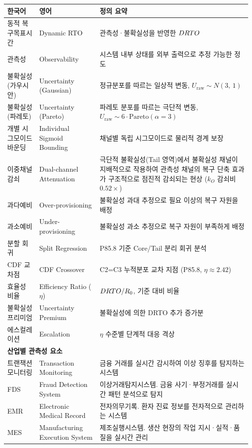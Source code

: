 \begin{longtable}{p{3.5cm} p{4cm} p{7cm}}
\toprule
\textbf{한국어} & \textbf{영어} & \textbf{정의 요약} \\
\midrule
\endhead
동적 복구목표시간 & Dynamic RTO & 관측성·불확실성을 반영한 $DRTO$ \\
관측성 & Observability & 시스템 내부 상태를 외부 출력으로 추정 가능한 정도 \\
불확실성 (가우시안) & Uncertainty (Gaussian) & 정규분포를 따르는 일상적 변동, $U_{\mathrm{raw}} \sim N(3,\,1)$ \\
불확실성 (파레토) & Uncertainty (Pareto) & 파레토 분포를 따르는 극단적 변동, $U_{\mathrm{raw}} \sim 6 \cdot \mathrm{Pareto}(\alpha=3)$ \\
개별 시그모이드 바운딩 & Individual Sigmoid Bounding & 채널별 독립 시그모이드로 물리적 경계 보장 \\
이중채널 감쇠 & Dual-channel Attenuation & 극단적 불확실성(Tail 영역)에서 불확실성 채널이 지배적으로 작용하여 관측성 채널의 복구 단축 효과가 구조적으로 점진적 감쇠되는 현상 ($k_O$ 감쇠비 $0.52\times$) \\
과다예비 & Over-provisioning & 불확실성 과대 추정으로 필요 이상의 복구 자원을 배정 \\
과소예비 & Under-provisioning & 불확실성 과소 추정으로 복구 자원이 부족하게 배정 \\
분할 회귀 & Split Regression & P85.8 기준 Core/Tail 분리 회귀 분석 \\
CDF 교차점 & CDF Crossover & C2=C3 누적분포 교차 지점 (P85.8, $\eta \approx 2.42$) \\
효율성 비율 & Efficiency Ratio ($\eta$) & $DRTO / R_0$, 기준 대비 비율 \\
불확실성 프리미엄 & Uncertainty Premium & 불확실성에 의한 DRTO 추가 증가분 \\
에스컬레이션 & Escalation & $\eta$ 수준별 단계적 대응 격상 \\
\midrule
\multicolumn{3}{l}{\textbf{산업별 관측성 요소}} \\
\midrule
트랜잭션 모니터링 & Transaction Monitoring & 금융 거래를 실시간 감시하여 이상 징후를 탐지하는 시스템 \\
FDS & Fraud Detection System & 이상거래탐지시스템. 금융 사기·부정거래를 실시간 패턴 분석으로 탐지 \\
EMR & Electronic Medical Record & 전자의무기록. 환자 진료 정보를 전자적으로 관리하는 시스템 \\
MES & Manufacturing Execution System & 제조실행시스템. 생산 현장의 작업 지시·실적·품질을 실시간 관리 \\

\end{longtable}
